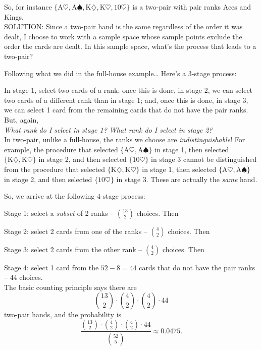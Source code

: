 \documentclass[12pt]{article}
\begin{document}
\noindent So, for instance $\{\mbox{A}\heartsuit, \mbox{A}\spadesuit, \mbox{K}\diamondsuit, \mbox{K}\heartsuit, 10\heartsuit\}$ is a two-pair with pair ranks Aces and Kings.\\

\noindent SOLUTION: Since a two-pair hand is the same regardless of the order it was dealt,
I choose to work with a sample space whose sample points exclude the order the cards are dealt.
In this sample space, what's the process that leads to a two-pair?

Following what we did in the full-house example\dots
Here's a 3-stage process:

\noindent In stage 1, select two cards of a rank; once this is done, in stage 2, we can select two cards of a different rank than in stage 1; and, once this is done, in stage 3, we can select 1 card from the remaining cards that do not have the pair ranks. But, again,\\

{\em What rank do I select in stage 1?  What rank do I select in stage 2?}\\

\noindent In two-pair, unlike a full-house, the ranks we choose are {\em indistinguishable}!  For example,
the procedure that selected $\{\mbox{A}\heartsuit,\mbox{A}\spadesuit\}$ in stage 1, then selected $\{\mbox{K}\diamondsuit, \mbox{K}\heartsuit\}$ in stage 2, and then
selected $\{10\heartsuit\}$ in stage 3 cannot be distinguished from the procedure that selected $\{\mbox{K}\diamondsuit, \mbox{K}\heartsuit\}$ in stage 1, then selected
$\{\mbox{A}\heartsuit,\mbox{A}\spadesuit\}$ in stage 2, and then selected $\{10\heartsuit\}$ in stage 3.  These are actually the {\em same} hand.

So, we arrive at the following 4-stage process:

Stage 1: select a {\em subset} of 2 ranks -- ${13\choose 2}$ choices. Then

Stage 2: select 2 cards from one of the ranks -- ${4\choose 2}$ choices. Then

Stage 3: select 2 cards from the other rank -- ${4\choose 2}$ choices. Then

Stage 4: select 1 card from the $52-8=44$ cards that do not have the pair ranks -- 44 choices.\\
The basic counting principle says there are
$${13\choose 2}\cdot {4\choose 2}\cdot {4\choose 2}\cdot 44$$
two-pair hands, and the probability is
$$\dfrac{{13\choose 2}\cdot {4\choose 2}\cdot {4\choose 2}\cdot 44}{{52\choose 5}} \approx 0.0475.$$
\end{document}
